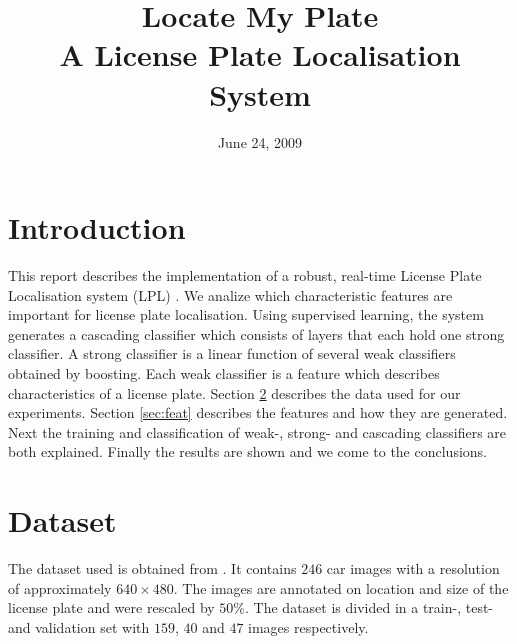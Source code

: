 \documentclass[a4paper,11pt]{article}
\title{Locate My Plate \\ A License Plate Localisation System}
\date{June 24, 2009}
\begin{document}
\maketitle
\section{Introduction}
This report describes the implementation of a robust, real-time License Plate
Localisation system (LPL) \cite{dlagnekov_thesis, zhang}. We analize which
characteristic features are important for license plate localisation. Using
supervised learning, the system generates a cascading classifier which consists
of layers that each hold one strong classifier. A strong classifier is a linear
function of several weak classifiers obtained by boosting. Each weak classifier
is a feature which describes characteristics of a license plate. Section
\ref{sec:data} describes the data used for our experiments. Section
\ref{sec:feat} describes the features and how they are generated. Next the
training and classification of weak-, strong- and cascading classifiers are
both explained. Finally the results are shown and we come to the conclusions.

\section{Dataset} \label{sec:data}
The dataset used is obtained from \cite{dlagnekov_dataset}. It contains $246$
car images with a resolution of approximately $640\times480$. The images are
annotated on location and size of the license plate and were rescaled by
$50\%$. The dataset is divided in a train-, test- and validation set with
$159$, $40$ and $47$ images respectively.
\end{document}
